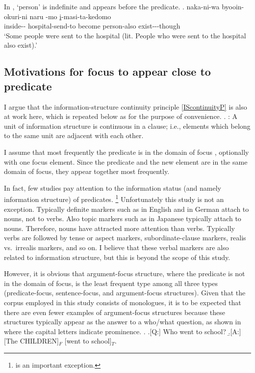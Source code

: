 In \Next,
 `person' is indefinite and appears before the predicate.
\exg. naka-ni-wa byooin-okuri-ni naru -mo \ul{i}-masi-ta-kedomo \\
		inside-- hospital-send-to become person-also exist---though \\
		`Some people were sent to the hospital (lit. People who were sent to the hospital also exist).'


\subsection{Motivations for focus to appear close to predicate}\label{WO:PreP:Motivation}

I argue that the information-structure continuity principle \ref{IScontinuityP} is also at work here, which is repeated below as \Next for the purpose of convenience.
%
\ex. \label{IScontinuityP2}:
 A unit of information structure is continuous in a clause;
 i.e., elements which belong to the same unit are adjacent with each other.

I assume that
most frequently the predicate is in the domain of focus \cite{lambrecht94},
optionally with one focus element.
Since the predicate and the new element are in the same domain of focus,
they appear together most frequently.

In fact, few studies pay attention to the information status (and namely information structure) of predicates.%
	\footnote{
	 is an important exception.
	}
Unfortunately this study is not an exception.
Typically definite markers such as  in English and  in German attach to nouns, not to verbs.
Also topic markers such as  in Japanese typically attach to nouns.
Therefore, nouns have attracted more attention than verbs.
Typically verbs are followed by tense or aspect markers, subordinate-clause markers, realis vs.\ irrealis markers, and so on.
I believe that these verbal markers are also related to information structure,
but this is beyond the scope of this study.

However,
it is obvious that argument-focus structure,
where the predicate is not in the domain of focus,
is the least frequent type among all three types (predicate-focus, sentence-focus, and argument-focus structures).
Given that the corpus employed in this study consists of monologues, it is to be expected that there are even fewer examples of argument-focus structures because these structures typically appear as the answer to a who/what question, as shown in \Next where the capital letters indicate prominence.
%
\ex.
 \a.[Q:] Who went to school?
 \b.[A:] [The CHILDREN]$_{F}$ [went to school]$_{T}$.
 \hfill{\cite[][121]{lambrecht94}}

